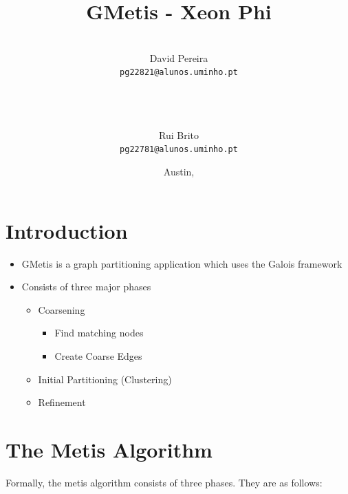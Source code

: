 \documentclass[abstract=on,9pt,twocolumn]{scrartcl}
\title{GMetis - Xeon Phi}
\author{
    \\David Pereira\\
     	\texttt{\smaller pg22821@alunos.uminho.pt}
\\~\\~
\and\\Rui Brito\\
	\texttt{\smaller pg22781@alunos.uminho.pt}
}
\date{Austin, \docdate}
\begin{document}
\maketitle	



\begin{abstract}

\end{abstract}



\section{Introduction}


\begin{itemize}
  \item GMetis is a graph partitioning application which uses the Galois
    framework
  \item Consists of three major phases
    \begin{itemize}
      \item Coarsening
      \begin{itemize}
        \item Find matching nodes
        \item Create Coarse Edges
      \end{itemize}
      \item Initial Partitioning (Clustering)
      \item Refinement
    \end{itemize}
\end{itemize}




\section{The Metis Algorithm}
\label{sec:metis_alg}

  Formally, the metis algorithm consists of three phases. They are as follows:
\end{document}
